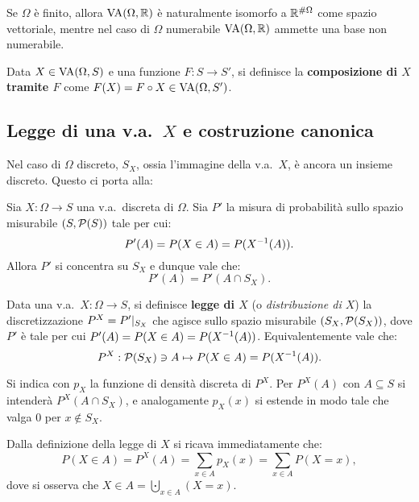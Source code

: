 \begin{multicols*}{2}
\begin{remark}
    Se $\Omega$ è finito, allora $\operatorname{VA}(\Omega, \mathbb{R})$ è naturalmente isomorfo
    a $\mathbb{R}^{\# \Omega}$ come spazio vettoriale, mentre
    nel caso di $\Omega$ numerabile $\operatorname{VA}(\Omega, \mathbb{R})$ ammette una base non numerabile.
\end{remark}

\begin{definition}
    Data $X \in \operatorname{VA}(\Omega, S)$ e una funzione $F : S \to S'$,
    si definisce la \textbf{composizione di $X$ tramite $F$}
    come $F(X) = F \circ X \in \operatorname{VA}(\Omega, S')$.
\end{definition}

\subsection{Legge di una v.a.~\texorpdfstring{$X$}{X} e costruzione canonica}

Nel caso di $\Omega$ discreto, $S_X$, ossia l'immagine della v.a.~$X$, è
ancora un insieme discreto. Questo ci porta alla:

\begin{proposition}
    Sia $X : \Omega \to S$ una v.a.~discreta di $\Omega$.
    Sia $P'$ la misura di probabilità sullo spazio misurabile
    $(S, \mathcal{P}(S))$ tale per cui:
    \[
        P'(A) = P(X \in A) = P(X^{-1}(A)).
    \]
    Allora $P'$ si concentra su $S_X$ e dunque vale che:
    \[
        P'(A) = P'(A \cap S_X).
    \]
\end{proposition}
    
\begin{definition}[Legge di $X$]
    Data una v.a.~$X : \Omega \to S$, si definisce \textbf{legge di $X$} (o \textit{distribuzione
    di $X$}) la discretizzazione $P^X = P'\arrowvert_{S_X}$ che
    agisce sullo spazio misurabile $(S_X, \mathcal{P}(S_X))$, dove
    $P'$ è tale per cui $P'(A) = P(X \in A) = P(X^{-1}(A))$.
    Equivalentemente vale che:
    \[
        P^X : \mathcal{P}(S_X) \ni A \mapsto P(X \in A) = P(X^{-1}(A)).
    \]


    Si indica con $p_X$ la funzione di densità discreta di $P^X$.
    Per $P^X(A)$ con $A \subseteq S$ si intenderà
    $P^X(A \cap S_X)$, e analogamente $p_X(x)$ si estende in modo
    tale che valga $0$ per $x \notin S_X$.
\end{definition}

\begin{remark}
    Dalla definizione della legge di $X$ si ricava immediatamente che:
    \[
        P(X \in A) = P^X(A) = \sum_{x \in A} p_X(x) = \sum_{x \in A} P(X = x),
    \]
    dove si osserva che $X \in A = \bigcupdot_{x \in A} (X = x)$.
\end{remark}


\end{multicols*}
